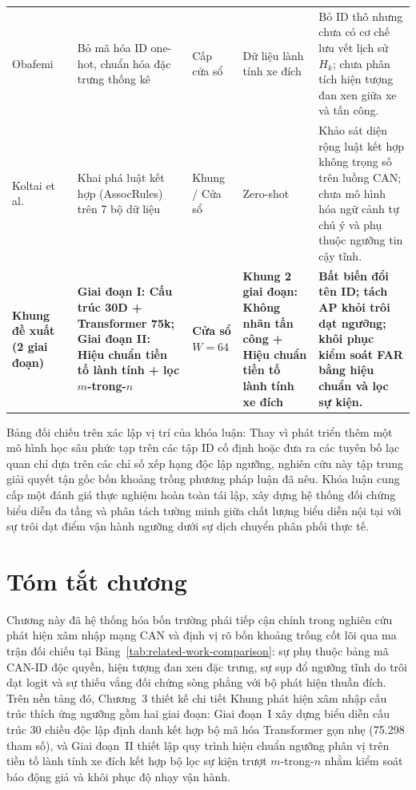 \documentclass[12pt, a4paper, reqno, oneside]{book}
\begin{document}
\begin{longtable}{P{2.5cm}P{2.9cm}P{1.8cm}P{2.2cm}P{5.1cm}}
Obafemi~\cite{obafemi2026travel} & Bỏ mã hóa ID one-hot, chuẩn hóa đặc trưng thống kê & Cấp cửa sổ & Dữ liệu lành tính xe đích & Bỏ ID thô nhưng chưa có cơ chế lưu vết lịch sử $H_k$; chưa phân tích hiện tượng đan xen giữa xe và tấn công.\\
Koltai et al.~\cite{koltai2026trust} & Khai phá luật kết hợp (AssocRules) trên 7 bộ dữ liệu & Khung / Cửa sổ & Zero-shot & Khảo sát diện rộng luật kết hợp không trọng số trên luồng CAN; chưa mô hình hóa ngữ cảnh tự chú ý và phụ thuộc ngưỡng tin cậy tĩnh.\\
\textbf{Khung đề xuất (2 giai đoạn)} & \textbf{Giai đoạn I: Cấu trúc 30D + Transformer 75k; Giai đoạn II: Hiệu chuẩn tiền tố lành tính + lọc $m$-trong-$n$} & \textbf{Cửa sổ $W=64$} & \textbf{Khung 2 giai đoạn: Không nhãn tấn công + Hiệu chuẩn tiền tố lành tính xe đích} & \textbf{Bất biến đổi tên ID; tách AP khỏi trôi dạt ngưỡng; khôi phục kiểm soát FAR bằng hiệu chuẩn và lọc sự kiện.}\\\bottomrule
\end{longtable}

Bảng đối chiếu trên xác lập vị trí của khóa luận: Thay vì phát triển thêm một mô hình học sâu phức tạp trên các tập ID cố định hoặc đưa ra các tuyên bố lạc quan chỉ dựa trên các chỉ số xếp hạng độc lập ngưỡng, nghiên cứu này tập trung giải quyết tận gốc bốn khoảng trống phương pháp luận đã nêu. Khóa luận cung cấp một đánh giá thực nghiệm hoàn toàn tái lập, xây dựng hệ thống đối chứng biểu diễn đa tầng và phân tách tường minh giữa chất lượng biểu diễn nội tại với sự trôi dạt điểm vận hành ngưỡng dưới sự dịch chuyển phân phối thực tế.

\section{Tóm tắt chương}
Chương này đã hệ thống hóa bốn trường phái tiếp cận chính trong nghiên cứu phát hiện xâm nhập mạng CAN và định vị rõ bốn khoảng trống cốt lõi qua ma trận đối chiếu tại Bảng~\ref{tab:related-work-comparison}: sự phụ thuộc bảng mã CAN-ID độc quyền, hiện tượng đan xen đặc trưng, sự sụp đổ ngưỡng tĩnh do trôi dạt logit và sự thiếu vắng đối chứng sòng phẳng với bộ phát hiện thuần đích. Trên nền tảng đó, Chương~3 thiết kế chi tiết Khung phát hiện xâm nhập cấu trúc thích ứng ngưỡng gồm hai giai đoạn: Giai đoạn~I xây dựng biểu diễn cấu trúc 30 chiều độc lập định danh kết hợp bộ mã hóa Transformer gọn nhẹ (75.298 tham số), và Giai đoạn~II thiết lập quy trình hiệu chuẩn ngưỡng phân vị trên tiền tố lành tính xe đích kết hợp bộ lọc sự kiện trượt $m$-trong-$n$ nhằm kiểm soát báo động giả và khôi phục độ nhạy vận hành.
\end{document}
